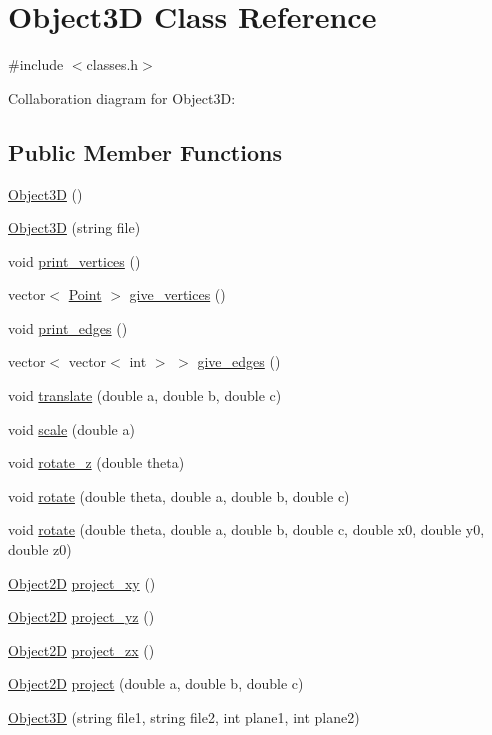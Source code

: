\hypertarget{classObject3D}{}\section{Object3D Class Reference}
\label{classObject3D}


{\ttfamily \#include $<$classes.\+h$>$}



Collaboration diagram for Object3D\+:
\subsection*{Public Member Functions}
\begin{DoxyCompactItemize}
\item 
\hyperlink{classObject3D_ae3a1b17fb43ab59f5cf7b0ee21b9120b}{Object3D} ()
\item 
\hyperlink{classObject3D_ae3f10dd2d8e3e3a96dca73b40e345375}{Object3D} (string file)
\item 
void \hyperlink{classObject3D_ada1a9fc9652fe0a548a8ecdac061c4f6}{print\+\_\+vertices} ()
\item 
vector$<$ \hyperlink{classPoint}{Point} $>$ \hyperlink{classObject3D_afedea745458d1a9910d01748129f0dcd}{give\+\_\+vertices} ()
\item 
void \hyperlink{classObject3D_ace48934d92890daad6dc569e89e3a82a}{print\+\_\+edges} ()
\item 
vector$<$ vector$<$ int $>$ $>$ \hyperlink{classObject3D_a8a4fef3fb749f72d1de7f855ab4f96cc}{give\+\_\+edges} ()
\item 
void \hyperlink{classObject3D_a5266235a36e5082d7727ad5050f38dc0}{translate} (double a, double b, double c)
\item 
void \hyperlink{classObject3D_aa910d21198273cad51bc08e61f3b8aa7}{scale} (double a)
\item 
void \hyperlink{classObject3D_aa2ceafd7250e5a2ec41ac5321eb7d82e}{rotate\+\_\+z} (double theta)
\item 
void \hyperlink{classObject3D_ae7f192e7b2da6473350c9aa75b18cd63}{rotate} (double theta, double a, double b, double c)
\item 
void \hyperlink{classObject3D_a14b80284f9b482375aa4ee135c30f95f}{rotate} (double theta, double a, double b, double c, double x0, double y0, double z0)
\item 
\hyperlink{classObject2D}{Object2D} \hyperlink{classObject3D_a6693c09478947acbd1db343a4e078119}{project\+\_\+xy} ()
\item 
\hyperlink{classObject2D}{Object2D} \hyperlink{classObject3D_aca283286fda96635052da68c760cb8fb}{project\+\_\+yz} ()
\item 
\hyperlink{classObject2D}{Object2D} \hyperlink{classObject3D_a79eda264b9b70a562f17eb6bb70ccd6b}{project\+\_\+zx} ()
\item 
\hyperlink{classObject2D}{Object2D} \hyperlink{classObject3D_adbd33325036cbcb35429ff2c741dd805}{project} (double a, double b, double c)
\item 
\hyperlink{classObject3D_a56ab97ef9b66d47272249ecca291eb70}{Object3D} (string file1, string file2, int plane1, int plane2)
\end{DoxyCompactItemize}


